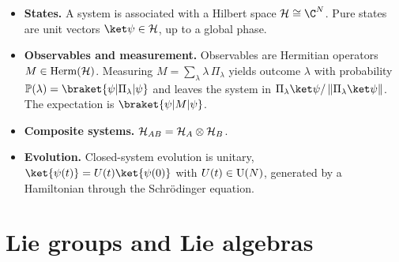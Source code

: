 \documentclass[handoutsbeamer.tex]{subfiles}
\begin{document}
\begin{frame}\label{frame:ch02:postulates}
\begin{itemize}\setlength\itemsep{0.4em}
    \item \textbf{States.} A system is associated with a Hilbert space $\Hil\cong\C^N$. Pure states are unit vectors $\ket\psi\in\Hil$, up to a global phase.
    \item \textbf{Observables and measurement.} Observables are Hermitian operators $M\in\Herm[\Hil]$. Measuring $M=\sum_\lambda \lambda\,\Pi_\lambda$ yields outcome $\lambda$ with probability $\Prob(\lambda)=\braket{\psi|\Pi_\lambda|\psi}$ and leaves the system in $\Pi_\lambda\ket\psi/\norm{\Pi_\lambda\ket\psi}$. The expectation is $\braket{\psi|M|\psi}$.
    \item \textbf{Composite systems.} $\Hil_{AB}=\Hil_A\otimes\Hil_B$.
    \item \textbf{Evolution.} Closed-system evolution is unitary, $\ket{\psi(t)}=U(t)\ket{\psi(0)}$ with $U(t)\in\Un[N]$, generated by a Hamiltonian through the Schr\"odinger equation.
\end{itemize}
\end{frame}

\section{Lie groups and Lie algebras}\label{sec:ch02:lie}
\end{document}
